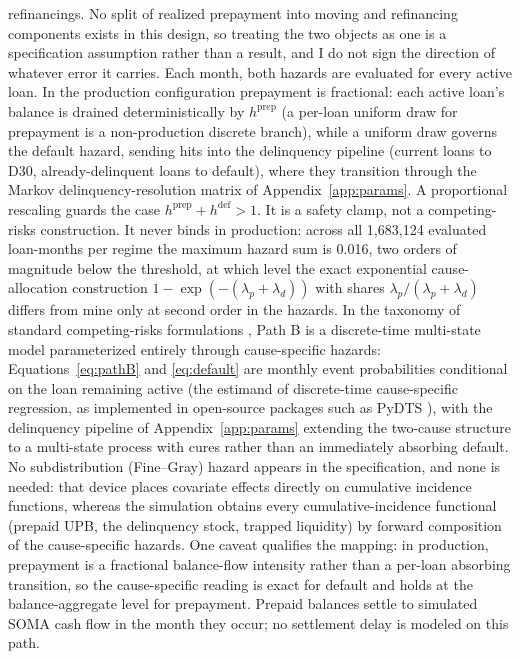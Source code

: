\documentclass[12pt]{article}
\begin{document}
refinancings. No split of realized prepayment into moving and refinancing components exists in this design, so treating the two objects as one is a specification assumption rather than a result, and I do not sign the direction of whatever error it carries. Each month, both hazards are evaluated for every active loan. In the production configuration prepayment is fractional: each active loan's balance is drained deterministically by $h^{\mathrm{prep}}$ (a per-loan uniform draw for prepayment is a non-production discrete branch), while a uniform draw governs the default hazard, sending hits into the delinquency pipeline (current loans to D30, already-delinquent loans to default), where they transition through the Markov delinquency-resolution matrix of Appendix~\ref{app:params}. A proportional rescaling guards the case $h^{\mathrm{prep}} + h^{\mathrm{def}} > 1$. It is a safety clamp, not a competing-risks construction. It never binds in production: across all 1,683,124 evaluated loan-months per regime the maximum hazard sum is 0.016, two orders of magnitude below the threshold, at which level the exact exponential cause-allocation construction $1-\exp(-(\lambda_p+\lambda_d))$ with shares $\lambda_p/(\lambda_p+\lambda_d)$ differs from mine only at second order in the hazards. In the taxonomy of standard competing-risks formulations \citep{putter2007}, Path B is a discrete-time multi-state model parameterized entirely through cause-specific hazards: Equations~\eqref{eq:pathB} and \eqref{eq:default} are monthly event probabilities conditional on the loan remaining active (the estimand of discrete-time cause-specific regression, as implemented in open-source packages such as PyDTS \citep{meir2025}), with the delinquency pipeline of Appendix~\ref{app:params} extending the two-cause structure to a multi-state process with cures rather than an immediately absorbing default. No subdistribution (Fine--Gray) hazard \citep{fine1999} appears in the specification, and none is needed: that device places covariate effects directly on cumulative incidence functions, whereas the simulation obtains every cumulative-incidence functional (prepaid UPB, the delinquency stock, trapped liquidity) by forward composition of the cause-specific hazards. One caveat qualifies the mapping: in production, prepayment is a fractional balance-flow intensity rather than a per-loan absorbing transition, so the cause-specific reading is exact for default and holds at the balance-aggregate level for prepayment. Prepaid balances settle to simulated SOMA cash flow in the month they occur; no settlement delay is modeled on this path.
\end{document}
